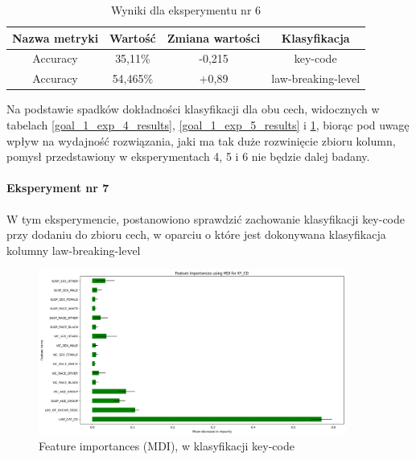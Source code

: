\documentclass{classrep}
\begin{document}
{{{{                    \begin{table}
                    \centering
                     \begin{tabular}{|c|c|c|c|}
                            \hline
                          Nazwa metryki & Wartość & Zmiana wartości & Klasyfikacja \\ \hline
                            Accuracy &  35,11\% & -0,215 & key-code\\ \hline
                            Accuracy &  54,465\% & +0,89 & law-breaking-level\\ \hline
                        \end{tabular}
                        \caption{Wyniki dla eksperymentu nr 6}
                        \label{goal_1_exp_6_results}
                     \end{table}
                     \FloatBarrier
                     Na podstawie spadków dokładności klasyfikacji dla obu cech, widocznych w tabelach \ref{goal_1_exp_4_results}, \ref{goal_1_exp_5_results} i \ref{goal_1_exp_6_results}, biorąc pod uwagę wpływ na wydajność rozwiązania, jaki ma tak duże rozwinięcie zbioru kolumn, pomysł przedstawiony w eksperymentach 4, 5 i 6 nie będzie dalej badany.
                }
                \paragraph{Eksperyment nr 7}{
                    W tym eksperymencie, postanowiono sprawdzić zachowanie klasyfikacji key-code przy dodaniu do zbioru cech, w oparciu o które jest dokonywana klasyfikacja kolumny law-breaking-level
                    \begin{figure}[!htbp]
                        \centering
                        \includegraphics[width=0.9\textwidth]{img/5.1.3/7/Feature importances using MDI for KY_CD.png}
                        \caption{Feature importances (MDI), w klasyfikacji key-code}
                        \label{goal_1_exp_7_imp_mdi_key}
                    \end{figure}
                    
}}}}
\end{document}
